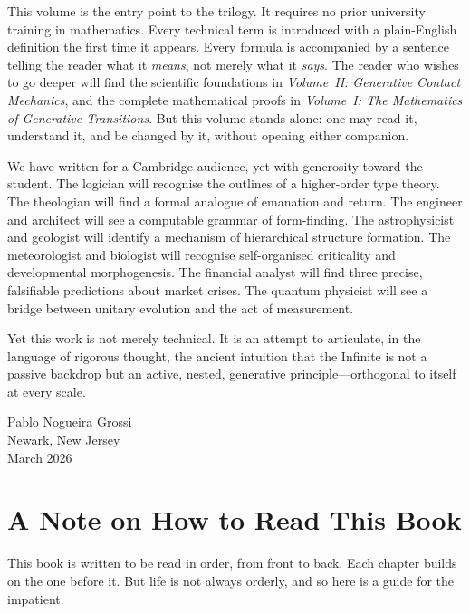 \documentclass[12pt, oneside]{book}
\theoremstyle{plain}
\theoremstyle{definition}
\theoremstyle{remark}
\begin{document}
This volume is the entry point to the trilogy. It requires no prior
university training in mathematics. Every technical term is introduced
with a plain-English definition the first time it appears. Every
formula is accompanied by a sentence telling the reader what it
\emph{means}, not merely what it \emph{says}. The reader who wishes
to go deeper will find the scientific foundations in \emph{Volume~II:
Generative Contact Mechanics}, and the complete mathematical
proofs in \emph{Volume~I: The Mathematics of Generative Transitions}.
But this volume stands alone: one may read it, understand it, and
be changed by it, without opening either companion.

We have written for a Cambridge audience, yet with generosity toward
the student. The logician will recognise the outlines of a higher-order
type theory. The theologian will find a formal analogue of emanation
and return. The engineer and architect will see a computable grammar
of form-finding. The astrophysicist and geologist will identify a
mechanism of hierarchical structure formation. The meteorologist and
biologist will recognise self-organised criticality and developmental
morphogenesis. The financial analyst will find three precise,
falsifiable predictions about market crises. The quantum physicist
will see a bridge between unitary evolution and the act of measurement.

Yet this work is not merely technical. It is an attempt to articulate,
in the language of rigorous thought, the ancient intuition that the
Infinite is not a passive backdrop but an active, nested, generative
principle---orthogonal to itself at every scale.

\bigskip
\begin{flushright}
Pablo Nogueira Grossi\\
Newark, New Jersey\\
March 2026
\end{flushright}

\cleardoublepage

\tableofcontents
\cleardoublepage

\chapter*{A Note on How to Read This Book}

This book is written to be read in order, from front to back.
Each chapter builds on the one before it. But life is not always
orderly, and so here is a guide for the impatient.
\end{document}
